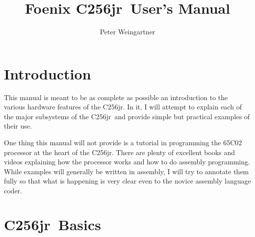 \documentclass[oneside]{book}
\newcommand{\jr}{{\sc C256jr}}
\begin{document}
\title{Foenix \jr\ User's Manual}
\author{Peter Weingartner}
\maketitle

\chapter{Introduction}

This manual is meant to be as complete as possible an introduction to the various hardware features of the \jr. In it, I will attempt to explain each of the major subsystems of the \jr\ and provide simple but practical examples of their use.

One thing this manual will not provide is a tutorial in programming the 65C02 processor at the heart of the \jr. There are plenty of excellent books and videos explaining how the processor works and how to do assembly programming. While examples will generally be written in assembly, I will try to annotate them fully so that what is happening is very clear even to the novice assembly language coder.

\chapter{\jr\ Basics}










\end{document}
